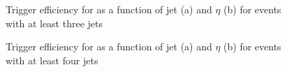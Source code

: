 \begin{figure}[hbtp]
    \centering
{}
\hfill
{}
\caption[Trigger efficiency for \HLTThreeCentralPFJet as a function of jet \pt and $\eta$]{Trigger efficiency for
\HLTThreeCentralPFJet as a function of jet \pt (a) and $\eta$ (b) for events with at least three jets}
\label{fig:top_hlt_pt_eta_3jets} 
 \end{figure}

\begin{figure}[hbtp]
    \centering
{}
\hfill
{}
\caption[Trigger efficiency for \HLTThreeCentralPFJet as a function of jet \pt and $\eta$]{Trigger efficiency for
\HLTThreeCentralPFJet as a function of jet \pt (a) and $\eta$ (b) for events with at least four jets}
\label{fig:top_hlt_pt_eta_4jets} 
 \end{figure}




